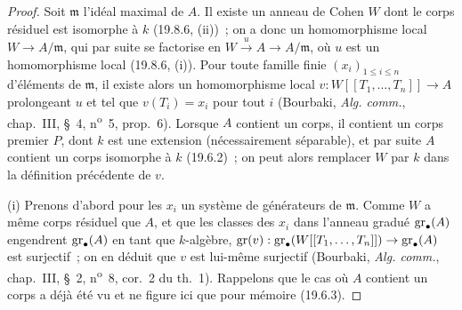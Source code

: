 \begin{proof}
Soit $\mathfrak m$ l'idéal maximal de $A$. Il existe un anneau de Cohen $W$ dont
le corps résiduel est isomorphe à $k$ (19.8.6, (ii))~; on a donc un
homomorphisme local $W\to A/\mathfrak m$, qui par suite se factorise en
$W\xrightarrow{u}A\to A/\mathfrak m$, où $u$ est un homomorphisme local
(19.8.6, (i)). Pour toute famille finie $(x_i)_{1\leq i\leq n}$ d'éléments de
$\mathfrak m$, il existe alors un homomorphisme local
$v:W[[T_1,\ldots,T_n]]\to A$ prolongeant $u$ et tel que $v(T_i)=x_i$ pour tout
$i$ (Bourbaki, \emph{Alg. comm.}, chap.~III, §~4, n\textsuperscript{o}~5,
prop.~6). Lorsque $A$ contient un corps, il contient un corps premier $P$, dont
$k$ est une extension (nécessairement séparable), et par suite $A$ contient un
corps isomorphe à $k$ (19.6.2)~; on peut alors remplacer $W$ par $k$ dans la
définition précédente de $v$.

\medskip
\noindent(i)\enspace
Prenons d'abord pour les $x_i$ un système de générateurs de $\mathfrak m$. Comme
$W$ a même corps résiduel que $A$, et que les classes des $x_i$ dans l'anneau
gradué $\operatorname{gr}_\bullet(A)$ engendrent $\operatorname{gr}_\bullet(A)$ en tant que $k$-algèbre,
$\operatorname{gr}(v):\operatorname{gr}_\bullet(W[[T_1,\ldots,T_n]])\to\operatorname{gr}_\bullet(A)$ est surjectif~; on
en déduit que $v$ est lui-même surjectif (Bourbaki, \emph{Alg. comm.},
chap.~III, §~2, n\textsuperscript{o}~8, cor.~2 du th.~1). Rappelons que le cas
où $A$ contient un corps a déjà été vu et ne figure ici que pour mémoire
(19.6.3).


\end{proof}

